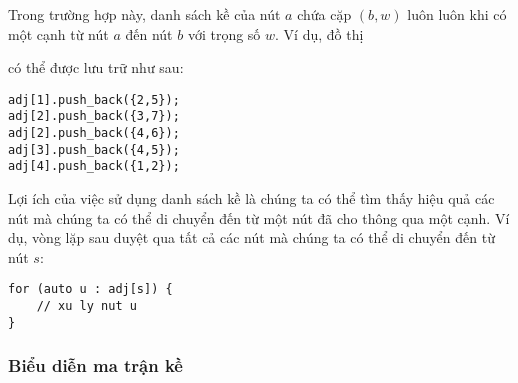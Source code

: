 Trong trường hợp này, danh sách kề của nút $a$
chứa cặp $(b,w)$
luôn luôn khi có một cạnh từ nút $a$ đến nút $b$
với trọng số $w$. Ví dụ, đồ thị

\begin{center}
\end{center}
có thể được lưu trữ như sau:
\begin{lstlisting}
adj[1].push_back({2,5});
adj[2].push_back({3,7});
adj[2].push_back({4,6});
adj[3].push_back({4,5});
adj[4].push_back({1,2});
\end{lstlisting}

Lợi ích của việc sử dụng danh sách kề là
chúng ta có thể tìm thấy hiệu quả các nút mà
chúng ta có thể di chuyển đến từ một nút đã cho thông qua một cạnh.
Ví dụ, vòng lặp sau duyệt qua tất cả các nút
mà chúng ta có thể di chuyển đến từ nút $s$:

\begin{lstlisting}
for (auto u : adj[s]) {
    // xu ly nut u
}
\end{lstlisting}

\subsubsection{Biểu diễn ma trận kề}


